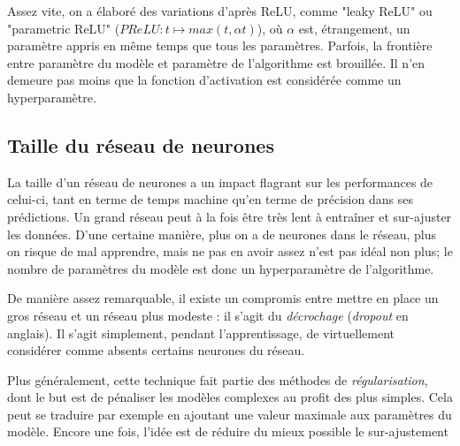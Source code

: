 Assez vite, on a élaboré des variations d'après ReLU, comme "leaky ReLU" ou "parametric ReLU" (\(\mathit{PReLU} : t \mapsto max(t, \alpha t)\)), où \(\alpha\) est, étrangement, un paramètre appris en même temps que tous les paramètres. Parfois, la frontière entre paramètre du modèle et paramètre de l'algorithme est brouillée. Il n'en demeure pas moins que la fonction d'activation est considérée comme un hyperparamètre.

\subsection{Taille du réseau de neurones}
La taille d'un réseau de neurones a un impact flagrant sur les performances de celui-ci, tant en terme de temps machine qu'en terme de précision dans ses prédictions. Un grand réseau peut à la fois être très lent à entraîner et sur-ajuster les données. D'une certaine manière, plus on a de neurones dans le réseau, plus on risque de mal apprendre, mais ne pas en avoir assez n'est pas idéal non plus; le nombre de paramètres du modèle est donc un hyperparamètre de l'algorithme.

De manière assez remarquable, il existe un compromis entre mettre en place un gros réseau et un réseau plus modeste : il s'agit du \emph{décrochage} (\emph{dropout} en anglais). Il s'agit simplement, pendant l'apprentissage, de virtuellement considérer comme absents certains neurones du réseau.

Plus généralement, cette technique fait partie des méthodes de \emph{régularisation}, dont le but est de pénaliser les modèles complexes au profit des plus simples. Cela peut se traduire par exemple en ajoutant une valeur maximale aux paramètres du modèle. Encore une fois, l'idée est de réduire du mieux possible le sur-ajustement